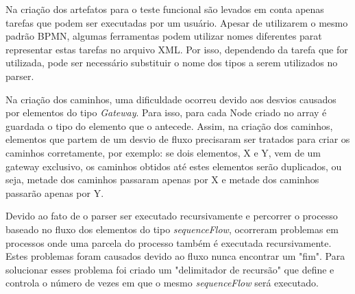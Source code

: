 \documentclass[12pt]{article}
\begin{document}
Na criação dos artefatos para o teste funcional são levados em conta apenas tarefas que podem ser executadas por um usuário. Apesar de utilizarem o mesmo padrão BPMN, algumas ferramentas podem utilizar nomes diferentes parat representar estas tarefas no arquivo XML. Por isso, dependendo da tarefa que for utilizada, pode ser necessário substituir o nome dos tipos a serem utilizados no parser.



Na criação dos caminhos, uma dificuldade ocorreu devido aos desvios causados por elementos do tipo \emph{Gateway}. Para isso, para cada Node criado no array é guardada o tipo do elemento que o antecede. Assim, na criação dos caminhos, elementos que partem de um desvio de fluxo precisaram ser tratados para criar os caminhos corretamente, por exemplo: se dois elementos, X e Y, vem de um gateway exclusivo, os caminhos obtidos até estes elementos serão duplicados, ou seja, metade dos caminhos passaram apenas por X e metade dos caminhos passarão apenas por Y.


Devido ao fato de o parser ser executado recursivamente e percorrer o processo baseado no fluxo dos elementos do tipo \emph{sequenceFlow}, ocorreram problemas em processos onde uma parcela do processo também é executada recursivamente. Estes problemas foram causados devido ao fluxo nunca encontrar um "fim". Para solucionar esses problema foi criado um "delimitador de recursão" que define e controla o número de vezes em que o mesmo \emph{sequenceFlow} será executado.


\end{document}
